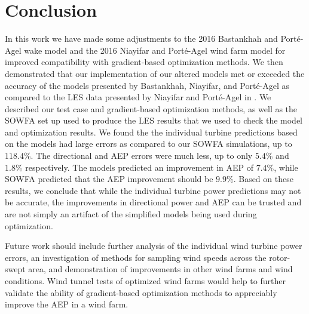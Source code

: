 \documentclass[conf]{new-aiaa}
\begin{document}
\section{Conclusion}
In this work we have made some adjustments to the 2016 Bastankhah and Port\'{e}-Agel wake model and the 2016 Niayifar and Port\'{e}-Agel wind farm model for improved compatibility with gradient-based optimization methods. We then demonstrated that our implementation of our altered models met or exceeded the accuracy of the models presented by Bastankhah, Niayifar, and Port\'{e}-Agel as compared to the LES data presented by Niayifar and Port\'{e}-Agel in \cite{niayifar2016}. We described our test case and gradient-based optimization methods, as well as the SOWFA set up used to produce the LES results that we used to check the model and optimization results. We found the the individual turbine predictions based on the models had large errors as compared to our SOWFA simulations, up to $118.4\%$. The directional and AEP errors were much less, up to only $5.4\%$ and $1.8\%$ respectively. The models predicted an improvement in AEP of $7.4\%$, while SOWFA predicted that the AEP improvement should be $9.9\%$. Based on these results, we conclude that while the individual turbine power predictions may not be accurate, the improvements in directional power and AEP can be trusted and are not simply an artifact of the simplified models being used during optimization.

Future work should include further analysis of the individual wind turbine power errors, an investigation of methods for sampling wind speeds across the rotor-swept area, and demonstration of improvements in other wind farms and wind conditions. Wind tunnel tests of optimized wind farms would help to further validate the ability of gradient-based optimization methods to appreciably improve the AEP in a wind farm.




\end{document}
